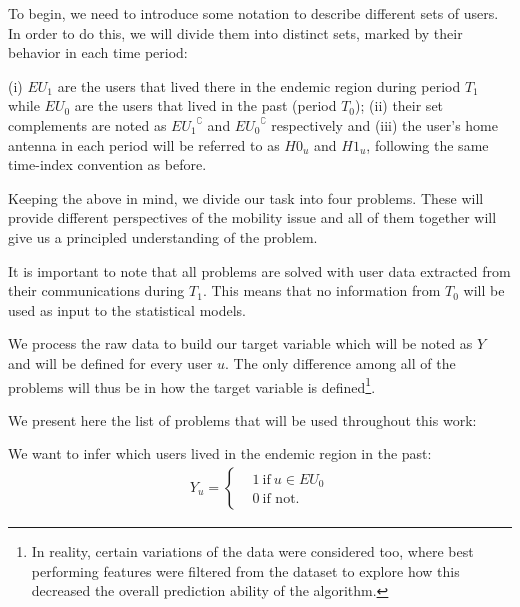 To begin, we need to introduce some notation to describe different sets of users.
In order to do this, we will divide them into distinct sets, marked by their behavior in each time period:

\begin{definition}\label{def:endemic_sets_periods}
	(i) $EU_{1}$ are the users that lived there in the endemic region during period $T_1$ while $EU_{0}$ are the users that lived in the past (period $T_0$);
	(ii) their set complements are noted as ${ EU_1 }^{\complement}$ and ${ EU_0 }^{\complement}$ respectively and
	(iii) the user's home antenna in each period will be referred to as $H0_u$ and $H1_u$, following the same time-index convention as before.
\end{definition}



Keeping the above in mind, we divide our task into four problems.
These will provide different perspectives of the mobility issue and all of them together will give us a principled understanding of the problem.

It is important to note that all problems are solved with user data extracted from their communications during $T_1$.
This means that no information from $T_0$ will be used as input to the statistical models.

We process the raw data to build our target variable which will be noted as $Y$ and will be defined for every user $u$.
The only difference among all of the problems will thus be in how the target variable is defined\footnote{In reality, certain variations of the data were considered too, where best performing features were filtered from the dataset to explore how this decreased the overall prediction ability of the algorithm.}.


We present here the list of problems that will be used throughout this work:


\begin{problem}\label{target1}
We want to infer which users lived in the endemic region in the past:
		\begin{align*}
		Y_u =
		\begin{cases}
		&1 \ \mbox{if} \ u \in EU_{0} \\
		&0 \ \mbox{if not}.
		\end{cases}
		\end{align*}
\end{problem}


